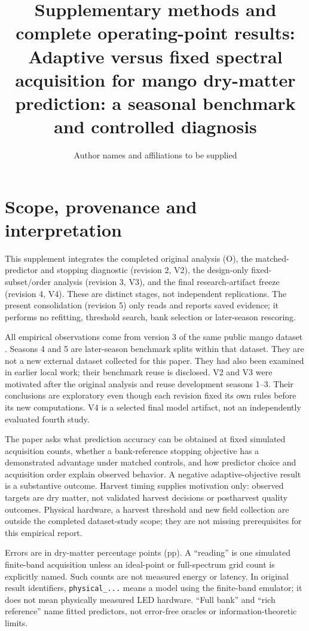 \documentclass[10pt,a4paper]{article}
\begin{document}
\title{Supplementary methods and complete operating-point results:\\Adaptive versus fixed spectral acquisition for mango dry-matter prediction: a seasonal benchmark and controlled diagnosis}
\author{Author names and affiliations to be supplied}
\date{}
\maketitle
\tableofcontents
\clearpage
\section{Scope, provenance and interpretation}
This supplement integrates the completed original analysis (O), the matched-predictor and stopping diagnostic (revision 2, V2), the design-only fixed-subset/order analysis (revision 3, V3), and the final research-artifact freeze (revision 4, V4). These are distinct stages, not independent replications. The present consolidation (revision 5) only reads and reports saved evidence; it performs no refitting, threshold search, bank selection or later-season rescoring.

All empirical observations come from version 3 of the same public mango dataset \citep{andersondata2024}. Seasons 4 and 5 are later-season benchmark splits within that dataset. They are not a new external dataset collected for this paper. They had also been examined in earlier local work; their benchmark reuse is disclosed. V2 and V3 were motivated after the original analysis and reuse development seasons 1--3. Their conclusions are exploratory even though each revision fixed its own rules before its new computations. V4 is a selected final model artifact, not an independently evaluated fourth study.

The paper asks what prediction accuracy can be obtained at fixed simulated acquisition counts, whether a bank-reference stopping objective has a demonstrated advantage under matched controls, and how predictor choice and acquisition order explain observed behavior. A negative adaptive-objective result is a substantive outcome. Harvest timing supplies motivation only: observed targets are dry matter, not validated harvest decisions or postharvest quality outcomes. Physical hardware, a harvest threshold and new field collection are outside the completed dataset-study scope; they are not missing prerequisites for this empirical report.

Errors are in dry-matter percentage points (pp). A ``reading'' is one simulated finite-band acquisition unless an ideal-point or full-spectrum grid count is explicitly named. Such counts are not measured energy or latency. In original result identifiers, \texttt{physical\_...} means a model using the finite-band emulator; it does not mean physically measured LED hardware. ``Full bank'' and ``rich reference'' name fitted predictors, not error-free oracles or information-theoretic limits.
\end{document}
